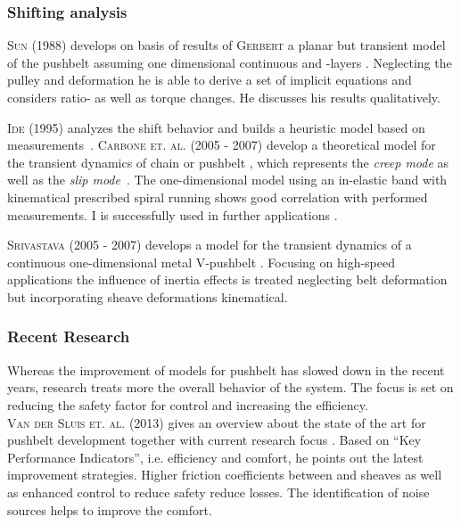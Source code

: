 \subsubsection{Shifting analysis}

\textsc{Sun} (1988) develops on basis of results of \textsc{Gerbert} a planar but transient model of the pushbelt \CVT assuming one dimensional continuous \els and \ring-layers \cite{sun_performance_1988}. 
Neglecting the pulley and \ring deformation he is able to derive a set of implicit equations and considers ratio- as well as torque changes.
He discusses his results qualitatively.\par

\textsc{Ide} (1995) analyzes the shift behavior and builds a heuristic model based on measurements~\cite{ide_simulation_1995}.
\textsc{Carbone et. al.} (2005 - 2007) develop a theoretical model for the transient dynamics of chain or pushbelt \CVTs, which represents the \emph{creep mode} as well as the \emph{slip mode}~\cite{carbone_influence_2005, carbone_cvt_2007}. The one-dimensional model using an in-elastic band with kinematical prescribed spiral running shows good correlation with performed measurements.
I is successfully used in further applications \cite{simons_shift_2008}.\par

\textsc{Srivastava} (2005 - 2007) develops a model for the transient dynamics of a continuous one-dimensional metal V-pushbelt \CVT \cite{srivastava_transient_2005, srivastava_transient_2007}. Focusing on high-speed applications the influence of inertia effects is treated neglecting belt deformation but incorporating sheave deformations kinematical.

\subsubsection{Recent Research}

Whereas the improvement of models for pushbelt \CVTs has slowed down in the recent years, research treats more the overall behavior of the system.
The focus is set on reducing the safety factor for control and increasing the efficiency.\\
\textsc{Van der Sluis et. al.} (2013) gives an overview about the state of the art for pushbelt \CVT development together with current research focus \cite{van_der_sluis_key_2013}.
Based on ``Key Performance Indicators'', i.e. efficiency and comfort, he points out the latest improvement strategies.
Higher friction coefficients between \els and sheaves as well as enhanced control to reduce safety reduce losses.
The identification of noise sources helps to improve the comfort. 

